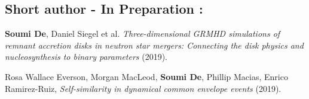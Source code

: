 \vspace{1.8mm}
\subsection{\textbf{Short author - In Preparation :}}
\vspace{1mm}
\begin{etaremune}
\renewcommand{\labelenumi}{\textcolor{gray}{\arabic{enumi}.}}
\item{\textbf{Soumi De}, Daniel Siegel et al. \textit{Three-dimensional GRMHD simulations of remnant accretion disks in neutron star mergers: Connecting the disk physics and nucleosynthesis to binary parameters} (2019).}

\item{Rosa Wallace Everson, Morgan MacLeod, \textbf{Soumi De}, Phillip Macias, Enrico Ramirez-Ruiz, \textit{Self-similarity in dynamical common envelope events} (2019).}
\end{etaremune}


